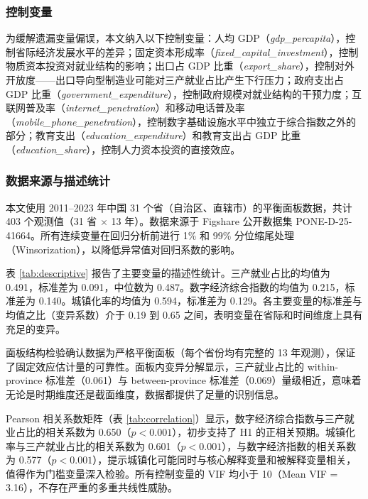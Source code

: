\subsubsection{控制变量}

为缓解遗漏变量偏误，本文纳入以下控制变量：人均 GDP（\textit{gdp\_percapita}），控制省际经济发展水平的差异；固定资本形成率（\textit{fixed\_capital\_investment}），控制物质资本投资对就业结构的影响；出口占 GDP 比重（\textit{export\_share}），控制对外开放度——出口导向型制造业可能对三产就业占比产生下行压力；政府支出占 GDP 比重（\textit{government\_expenditure}），控制政府规模对就业结构的干预力度；互联网普及率（\textit{internet\_penetration}）和移动电话普及率（\textit{mobile\_phone\_penetration}），控制数字基础设施水平中独立于综合指数之外的部分；教育支出（\textit{education\_expenditure}）和教育支出占 GDP 比重（\textit{education\_share}），控制人力资本投资的直接效应。

\subsubsection{数据来源与描述统计}

本文使用 2011--2023 年中国 31 个省（自治区、直辖市）的平衡面板数据，共计 403 个观测值（31 省 $\times$ 13 年）。数据来源于 Figshare 公开数据集 PONE-D-25-41664。所有连续变量在回归分析前进行 1\% 和 99\% 分位缩尾处理（Winsorization），以降低异常值对回归系数的影响。

表 \ref{tab:descriptive} 报告了主要变量的描述性统计。三产就业占比的均值为 0.491，标准差为 0.091，中位数为 0.487。数字经济综合指数的均值为 0.215，标准差为 0.140。城镇化率的均值为 0.594，标准差为 0.129。各主要变量的标准差与均值之比（变异系数）介于 0.19 到 0.65 之间，表明变量在省际和时间维度上具有充足的变异。



面板结构检验确认数据为严格平衡面板（每个省份均有完整的 13 年观测），保证了固定效应估计量的可靠性。面板内变异分解显示，三产就业占比的 within-province 标准差（0.061）与 between-province 标准差（0.069）量级相近，意味着无论是时期维度还是截面维度，数据都提供了足量的识别信息。

Pearson 相关系数矩阵（表 \ref{tab:correlation}）显示，数字经济综合指数与三产就业占比的相关系数为 0.650（$p<0.001$），初步支持了 H1 的正相关预期。城镇化率与三产就业占比的相关系数为 0.601（$p<0.001$），与数字经济指数的相关系数为 0.577（$p<0.001$），提示城镇化可能同时与核心解释变量和被解释变量相关，值得作为门槛变量深入检验。所有控制变量的 VIF 均小于 10（Mean VIF = 3.16），不存在严重的多重共线性威胁。


